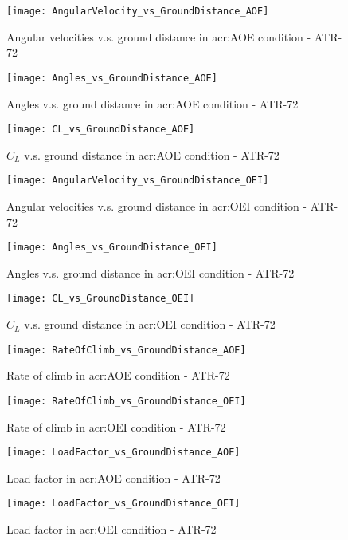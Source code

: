 %
\begin{figure}[H]
\centering
\texttt{[image: AngularVelocity\_vs\_GroundDistance\_AOE]}
\caption{Angular velocities v.s. ground distance in \gls{acr:AOE} condition - ATR-72}
\end{figure}
%
\begin{figure}[H]
\centering
\texttt{[image: Angles\_vs\_GroundDistance\_AOE]}
\caption{Angles v.s. ground distance in \gls{acr:AOE} condition - ATR-72}
\end{figure}
%
\begin{figure}[H]
\centering
\texttt{[image: CL\_vs\_GroundDistance\_AOE]}
\caption{$C_L$ v.s. ground distance in \gls{acr:AOE} condition - ATR-72}
\end{figure}
%
\begin{figure}[H]
\centering
\texttt{[image: AngularVelocity\_vs\_GroundDistance\_OEI]}
\caption{Angular velocities v.s. ground distance in \gls{acr:OEI} condition - ATR-72}
\end{figure}
%
\begin{figure}[H]
\centering
\texttt{[image: Angles\_vs\_GroundDistance\_OEI]}
\caption{Angles v.s. ground distance in \gls{acr:OEI} condition - ATR-72}
\end{figure}
%
\begin{figure}[H]
\centering
\texttt{[image: CL\_vs\_GroundDistance\_OEI]}
\caption{$C_L$ v.s. ground distance in \gls{acr:OEI} condition - ATR-72}
\end{figure}
%
\begin{figure}[!t]
\centering
\texttt{[image: RateOfClimb\_vs\_GroundDistance\_AOE]}
\caption{Rate of climb in \gls{acr:AOE} condition - ATR-72}
\end{figure}
%
\begin{figure}[!b]
\centering
\texttt{[image: RateOfClimb\_vs\_GroundDistance\_OEI]}
\caption{Rate of climb in \gls{acr:OEI} condition - ATR-72}
\end{figure}
%
\clearpage
%
\begin{figure}[H]
\centering
\texttt{[image: LoadFactor\_vs\_GroundDistance\_AOE]}
\caption{Load factor in \gls{acr:AOE} condition - ATR-72}
\end{figure}
%
\begin{figure}[H]
\centering
\texttt{[image: LoadFactor\_vs\_GroundDistance\_OEI]}
\caption{Load factor in \gls{acr:OEI} condition - ATR-72}
\end{figure}
